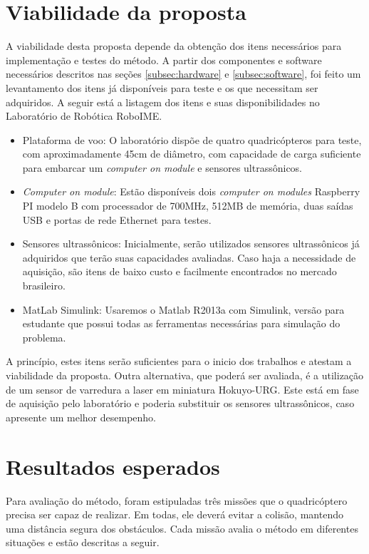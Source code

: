 \documentclass[a4paper, 12pt]{article}
\begin{document}
\newpage

\section{Viabilidade da proposta}
\label{sec:viabilidade}

A viabilidade desta proposta depende da obtenção dos itens necessários para implementação e testes do método. A partir dos componentes e software necessários descritos nas seções \ref{subsec:hardware} e \ref{subsec:software}, foi feito um levantamento dos itens já disponíveis para teste e os que necessitam ser adquiridos. A seguir está a listagem dos itens e suas disponibilidades no Laboratório de Robótica RoboIME.

\begin{itemize}
	\item
	Plataforma de voo:  O laboratório dispõe de quatro quadricópteros para teste, com aproximadamente 45cm de diâmetro, com capacidade de carga suficiente para embarcar um \textit{computer on module} e sensores ultrassônicos.
	\item
	\textit{Computer on module}: Estão disponíveis dois \textit{computer on modules} Raspberry PI modelo B com processador de 700MHz, 512MB de memória, duas saídas USB e portas de rede Ethernet para testes.
	\item
	Sensores ultrassônicos: Inicialmente, serão utilizados sensores ultrassônicos já adquiridos que terão suas capacidades avaliadas. Caso haja a necessidade de aquisição, são itens de baixo custo e facilmente encontrados no mercado brasileiro.
	\item
	MatLab Simulink: Usaremos o Matlab R2013a com Simulink, versão para estudante que possui todas as ferramentas necessárias para simulação do problema. 

\end{itemize}

A princípio, estes itens serão suficientes para o inicio dos trabalhos e atestam a viabilidade da proposta. Outra alternativa, que poderá ser avaliada, é a utilização de um sensor de varredura a laser em miniatura Hokuyo-URG. Este está em fase de aquisição pelo laboratório e poderia substituir os sensores ultrassônicos, caso apresente um melhor desempenho.

\newpage

\section{Resultados esperados}
\label{sec:resultados}
 Para avaliação do método, foram estipuladas três missões que o quadricóptero precisa ser capaz de realizar. Em todas, ele deverá evitar a colisão, mantendo uma distância segura dos obstáculos. Cada missão avalia o método em diferentes situações e estão descritas a seguir.
 
\end{document}
